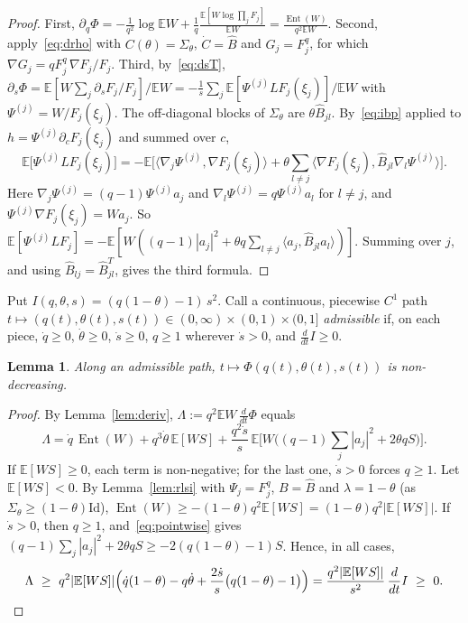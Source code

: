 \documentclass[11pt]{amsart}
\newtheorem{lemma}[theorem]{Lemma}
\theoremstyle{definition}
\newcommand{\E}{\mathbb{E}}
\newcommand{\Ent}{\operatorname{Ent}}
\newcommand{\Id}{\mathrm{Id}}
\begin{document}
\begin{proof}
First, $\partial_q\Phi=-\frac1{q^2}\log\E W+\frac1q\frac{\E[W\log\prod_jF_j]}{\E W}=\frac{\Ent(W)}{q^2\E W}$. Second,
apply~\eqref{eq:drho} with $C(\theta)=\Sigma_\theta$, $\dot C=\widehat B$ and $G_j=F_j^q$, for which
$\nabla G_j=qF_j^q\,\nabla F_j/F_j$. Third, by~\eqref{eq:dsT},
$\partial_s\Phi=\E[W\sum_j\partial_sF_j/F_j]/\E W=-\frac1s\sum_j\E[\Psi^{(j)}LF_j(\xi_j)]/\E W$ with
$\Psi^{(j)}=W/F_j(\xi_j)$. The off-diagonal blocks of $\Sigma_\theta$ are $\theta\widehat B_{jl}$. By~\eqref{eq:ibp}
applied to $h=\Psi^{(j)}\partial_cF_j(\xi_j)$ and summed over $c$,
\[
\E\big[\Psi^{(j)}LF_j(\xi_j)\big]=-\E\Big[\big\langle\nabla_j\Psi^{(j)},\nabla F_j(\xi_j)\big\rangle
+\theta\sum_{l\ne j}\big\langle\nabla F_j(\xi_j),\widehat B_{jl}\nabla_l\Psi^{(j)}\big\rangle\Big].
\]
Here $\nabla_j\Psi^{(j)}=(q-1)\Psi^{(j)}a_j$ and $\nabla_l\Psi^{(j)}=q\Psi^{(j)}a_l$ for $l\ne j$, and
$\Psi^{(j)}\nabla F_j(\xi_j)=Wa_j$. So $\E[\Psi^{(j)}LF_j]=-\E[W((q-1)|a_j|^2+\theta q\sum_{l\ne j}\langle a_j,\widehat B_{jl}a_l\rangle)]$.
Summing over $j$, and using $\widehat B_{lj}=\widehat B_{jl}^T$, gives the third formula.
\end{proof}

Put $I(q,\theta,s)=(q(1-\theta)-1)\,s^2$. Call a continuous, piecewise $C^1$ path
$t\mapsto(q(t),\theta(t),s(t))\in(0,\infty)\times(0,1)\times(0,1]$ \emph{admissible} if, on each piece, $\dot q\ge0$,
$\dot\theta\ge0$, $\dot s\ge0$, $q\ge1$ wherever $\dot s>0$, and $\frac{d}{dt}I\ge0$.

\begin{lemma}\label{lem:mono}
Along an admissible path, $t\mapsto\Phi(q(t),\theta(t),s(t))$ is non-decreasing.
\end{lemma}

\begin{proof}
By Lemma~\ref{lem:deriv}, $\Lambda:=q^2\E W\,\frac d{dt}\Phi$ equals
\[
\Lambda=\dot q\,\Ent(W)+q^3\dot\theta\,\E[WS]+\frac{q^2\dot s}s\,\E\Big[W\Big((q-1)\sum_j|a_j|^2+2\theta qS\Big)\Big].
\]
If $\E[WS]\ge0$, each term is non-negative; for the last one, $\dot s>0$ forces $q\ge1$. Let $\E[WS]<0$. By
Lemma~\ref{lem:rlsi} with $\Psi_j=F_j^q$, $B=\widehat B$ and $\lambda=1-\theta$ (as $\Sigma_\theta\ge(1-\theta)\Id$),
$\Ent(W)\ge-(1-\theta)q^2\E[WS]=(1-\theta)q^2|\E[WS]|$. If $\dot s>0$, then $q\ge1$, and~\eqref{eq:pointwise} gives
$(q-1)\sum_j|a_j|^2+2\theta qS\ge-2(q(1-\theta)-1)S$. Hence, in all cases,
\[
\Lambda\ \ge\ q^2|\E[WS]|\Big(\dot q(1-\theta)-q\dot\theta+\frac{2\dot s}s\big(q(1-\theta)-1\big)\Big)
=\frac{q^2|\E[WS]|}{s^2}\,\frac{d}{dt}I\ \ge\ 0 .\qedhere
\]
\end{proof}
\end{document}
